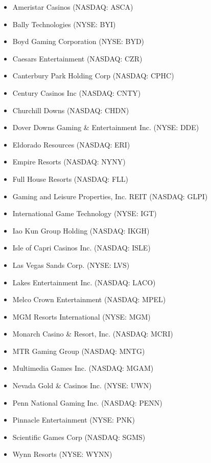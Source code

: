 \begin{itemize}
\item 	Ameristar Casinos (NASDAQ: ASCA)
\item 	Bally Technologies (NYSE: BYI)
\item 	Boyd Gaming Corporation (NYSE: BYD)
\item 	Caesars Entertainment (NASDAQ: CZR)
\item 	Canterbury Park Holding Corp (NASDAQ: CPHC)
\item 	Century Casinos Inc (NASDAQ: CNTY)
\item 	Churchill Downs (NASDAQ: CHDN)
\item 	Dover Downs Gaming \& Entertainment Inc. (NYSE: DDE)
\item 	Eldorado Resources (NASDAQ: ERI)
\item 	Empire Resorts (NASDAQ: NYNY)
\item 	Full House Resorts (NASDAQ: FLL)
\item 	Gaming and Leisure Properties, Inc. REIT (NASDAQ: GLPI)
\item 	International Game Technology (NYSE: IGT)
\item 	Iao Kun Group Holding (NASDAQ: IKGH)
\item 	Isle of Capri Casinos Inc. (NASDAQ: ISLE)
\item 	Las Vegas Sands Corp. (NYSE: LVS)
\item 	Lakes Entertainment Inc. (NASDAQ: LACO)
\item 	Melco Crown Entertainment (NASDAQ: MPEL)
\item 	MGM Resorts International (NYSE: MGM)
\item 	Monarch Casino \& Resort, Inc. (NASDAQ: MCRI)
\item 	MTR Gaming Group (NASDAQ: MNTG)
\item 	Multimedia Games Inc. (NASDAQ: MGAM)
\item 	Nevada Gold \& Casinos Inc. (NYSE: UWN)
\item 	Penn National Gaming Inc. (NASDAQ: PENN)
\item 	Pinnacle Entertainment (NYSE: PNK)
\item 	Scientific Games Corp (NASDAQ: SGMS)
\item 	Wynn Resorts (NYSE: WYNN)
\end{itemize}
